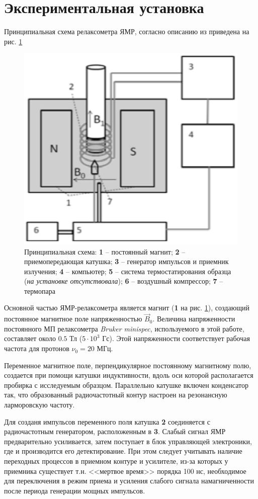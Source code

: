 \section{Экспериментальная установка}
Принципиальная схема релаксометра ЯМР, согласно описанию из \cite{met:1} приведена на рис. \ref{fig:installation}

\begin{figure}[h]
	\centering
	\includegraphics[width=0.6\linewidth]{Installation}
	\caption{Принципиальная схема: \textbf{1} -- постоянный магнит; \textbf{2} -- приемопередающая катушка; \textbf{3} -- генератор импульсов и приемник излучения; \textbf{4} -- компьютер; \textbf{5} -- система термостатирования образца (\textit{на установке отсутствовала}); \textbf{6} -- воздушный компрессор; \textbf{7} -- термопара}
	\label{fig:installation}
\end{figure}

Основной частью ЯМР-релаксометра является магнит (\textbf{1} на рис. \ref{fig:installation}), создающий постоянное магнитное поле напряженностью $ \vec{B}_0 $. Величина напряженности постоянного МП релаксометра \textit{Bruker minispec}, используемого в этой работе, составляет около $ 0.5 $ Тл ($ 5 \cdot 10^3 $ Гс). Этой напряженности соответствует рабочая частота для протонов $ \nu_0 = 20 $ МГц.

Переменное магнитное поле, перпендикулярное постоянному магнитному полю, создается при помощи катушки индуктивности, вдоль оси которой располагается пробирка с исследуемым образцом. Параллельно катушке включен конденсатор так, что образованный радиочастотный контур настроен на резонансную ларморовскую частоту.

Для созданя импульсов переменного поля катушка \textbf{2} соединяется с радиочастотным генератором, расположенным в \textbf{3}. Слабый сигнал ЯМР предварительно усиливается, затем поступает в блок управляющей электроники, где и производится его детектирование. При этом следует учитывать наличие переходных процессов в приемном контуре и усилителе, из-за которых у приемника существует т.н. <<мертвое время>> порядка 100 нс, необходимое для переключения в режим приема и усиления слабого сигнала намагниченности после периода генерации мощных импульсов.


